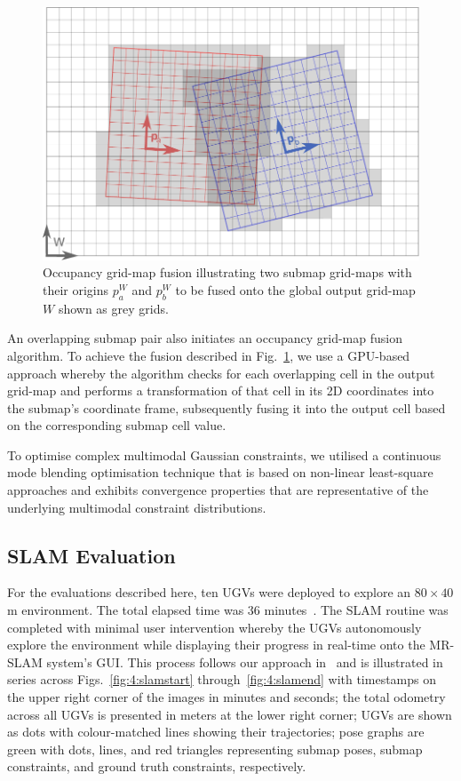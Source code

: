 \begin{figure}[H]
	\centering
	\includegraphics[width=0.7\linewidth]{fig5}
	\caption[Occupancy grid-map fusion]{Occupancy grid-map fusion illustrating two submap grid-maps with their origins $p^W_a$ and $p^W_b$ to be fused onto the global output grid-map $W$ shown as grey grids.}
	\label{fig:4:ogm}
\end{figure}

An overlapping submap pair also initiates an occupancy grid-map fusion algorithm. To achieve the fusion described in Fig.~\ref{fig:4:ogm}, we use a GPU-based approach whereby the algorithm checks for each overlapping cell in the output grid-map and performs a transformation of that cell in its 2D coordinates into the submap’s coordinate frame, subsequently fusing it into the output cell based on the corresponding submap cell value.

To optimise complex multimodal Gaussian constraints, we utilised a continuous mode blending optimisation technique that is based on non-linear least-square approaches and exhibits convergence properties that are representative of the underlying multimodal constraint distributions.

\subsection{SLAM Evaluation}
For the evaluations described here, ten UGVs were deployed to explore an $80\times40$ m environment. The total elapsed time was 36 minutes~\cite{reid_large-scale_2016}. The SLAM routine was completed with minimal user intervention whereby the UGVs autonomously explore the environment while displaying their progress in real-time onto the MR-SLAM system’s GUI. This process follows our approach in~\cite{s._lopes_autonomous_2011} and is illustrated in series across Figs.~\ref{fig:4:slamstart} through~\ref{fig:4:slamend} with timestamps on the upper right corner of the images in minutes and seconds; the total odometry across all UGVs is presented in meters at the lower right corner; UGVs are shown as dots with colour-matched lines showing their trajectories; pose graphs are green with dots, lines, and red triangles representing submap poses, submap constraints, and ground truth constraints, respectively.

